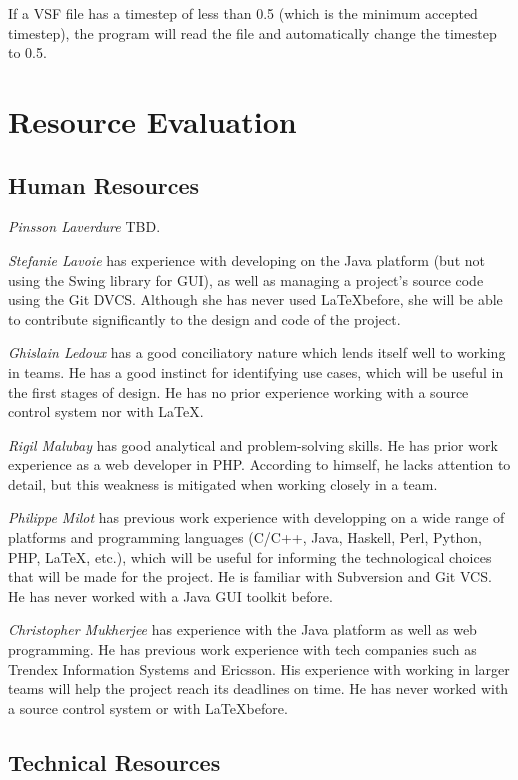 \documentclass{article}
\begin{document}
If a VSF file has a timestep of less than 0.5 (which is the minimum accepted timestep), the program will read the file and automatically change the timestep to 0.5.

\section{Resource Evaluation} %

\subsection{Human Resources} %

\emph{Pinsson Laverdure} TBD.

\emph{Stefanie Lavoie} has experience with developing on the Java platform (but not using the Swing library for GUI), as well as managing a project's source code using the Git DVCS. Although she has never used \LaTeX before, she will be able to contribute significantly to the design and code of the project.

\emph{Ghislain Ledoux} has a good conciliatory nature which lends itself well to working in teams. He has a good instinct for identifying use cases, which will be useful in the first stages of design. He has no prior experience working with a source control system nor with \LaTeX.

\emph{Rigil Malubay} has good analytical and problem-solving skills. He has prior work experience as a web developer in PHP. According to himself, he lacks attention to detail, but this weakness is mitigated when working closely in a team.

\emph{Philippe Milot} has previous work experience with developping on a wide range of platforms and programming languages (C/C++, Java, Haskell, Perl, Python, PHP, \LaTeX, etc.), which will be useful for informing the technological choices that will be made for the project. He is familiar with Subversion and Git VCS. He has never worked with a Java GUI toolkit before.

\emph{Christopher Mukherjee} has experience with the Java platform as well as web programming. He has previous work experience with tech companies such as Trendex Information Systems and Ericsson. His experience with working in larger teams will help the project reach its deadlines on time. He has never worked with a source control system or with \LaTeX before.

\subsection{Technical Resources} %
\end{document}
